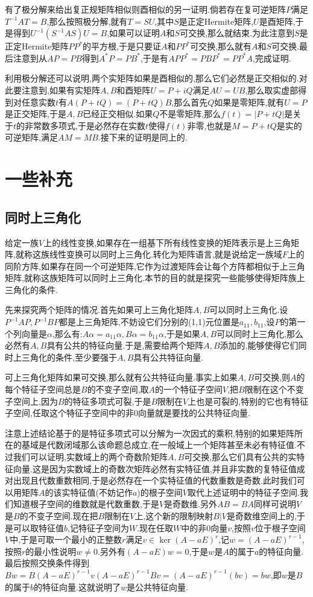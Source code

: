 有了极分解来给出复正规矩阵相似则酉相似的另一证明.倘若存在复可逆矩阵$P$满足$T^{-1}AT=B$,那么按照极分解,就有$T=SU$,其中$S$是正定Hermite矩阵,$U$是酉矩阵,于是得到$U^{-1}(S^{-1}AS)U=B$,如果可以证明$A$和$S$可交换,那么就结束.为此注意到$S$是正定Hermite矩阵$PP^*$的平方根,于是只要证$A$和$PP^*$可交换,那么就有$A$和$S$可交换.最后注意到从$AP=PB$得到$A^*P=PB^*$,于是有$APP^*=PBP^*=PP^*A$,完成证明.

利用极分解还可以说明,两个实矩阵如果是酉相似的,那么它们必然是正交相似的.对此要注意到,如果有实矩阵$A,B$和酉矩阵$U=P+iQ$满足$AU=UB$,那么取实虚部得到对任意实数$t$有$A(P+tQ)=(P+tQ)B$,那么首先$Q$如果是零矩阵,就有$U=P$是正交矩阵,于是$A,B$已经正交相似.如果$Q$不是零矩阵,那么$f(t)=|P+tQ|$是关于$t$的非常数多项式,于是必然存在实数$t$使得$f(t)$非零,也就是$M=P+tQ$是实的可逆矩阵,满足$AM=MB$.接下来的证明是同上的.
\newpage
\section{一些补充}
\subsection{同时上三角化}

给定一族$V$上的线性变换,如果存在一组基下所有线性变换的矩阵表示是上三角矩阵,就称这族线性变换可以同时上三角化.转化为矩阵语言,就是说给定一族域$F$上的同阶方阵,如果存在同一个可逆矩阵,它作为过渡矩阵会让每个方阵都相似于上三角矩阵,就称这族矩阵可以同时上三角化.本节的目的就是探究一些能够使得矩阵族上三角化的条件.

先来探究两个矩阵的情况.首先如果可上三角化矩阵$A,B$可以同时上三角化.设$P^{-1}AP,P^{-1}BP$都是上三角矩阵,不妨设它们分别的(1,1)元位置是$a_{11},b_{11}$,设$P$的第一个列向量是$\alpha$,那么有:$A\alpha=a_{11}\alpha,B\alpha=b_{11}\alpha$,于是如果$A,B$可以同时上三角化,那么必然有$A,B$具有公共的特征向量.于是,需要给两个矩阵$A,B$添加的,能够使得它们同时上三角化的条件,至少要强于$A,B$具有公共特征向量.

可上三角化矩阵如果可交换,那么就有公共特征向量.事实上如果$A,B$可交换,则$A$的每个特征子空间总是$B$的不变子空间,取$A$的一个特征子空间$V$,把$B$限制在这个不变子空间上,因为$B$的特征多项式可裂,于是$B$限制在$V$上也是可裂的,特别的它也有特征子空间,任取这个特征子空间中的非0向量就是要找的公共特征向量.

注意上述结论基于的是特征多项式可以分解为一次因式的乘积,特别的如果矩阵所在的基域是代数闭域那么该命题总成立,在一般域上一个矩阵甚至未必有特征值.不过我们可以证明,实数域上的两个奇数阶矩阵$A,B$可交换,那么它们具有公共的实特征向量.这是因为实数域上的奇数次矩阵必然有实特征值,并且非实数的复特征值成对出现且代数重数相同,于是必然存在一个实特征值的代数重数是奇数.此时我们可以用矩阵$A$的该实特征值(不妨记作$a$)的根子空间$V$取代上述证明中的特征子空间.我们知道根子空间的维数就是代数重数,于是$V$是奇数维.另外$AB=BA$同样可说明$V$是$B$的不变子空间.现在把$B$限制在$V$上,这个新的限制映射$B|V$是奇数维空间上的,于是可以取特征值$b$,记特征子空间为$W$.现在任取$W$中的非0向量$v$,按照$v$位于根子空间$V$中,于是可取一个最小的正整数$r$满足$v\in\ker(A-aE)^r$,记$w=(A-aE)^{r-1}$,按照$r$的最小性说明$w\not=0$.另外有$(A-aE)w=0$,于是$w$是$A$的属于$a$的特征向量.最后按照交换条件得到$Bw=B(A-aE)^{r-1}v(A-aE)^{r-1}Bv=(A-aE)^{r-1}(bv)=bw$,即$w$是$B$的属于$b$的特征向量.这就说明了$w$是公共特征向量.

